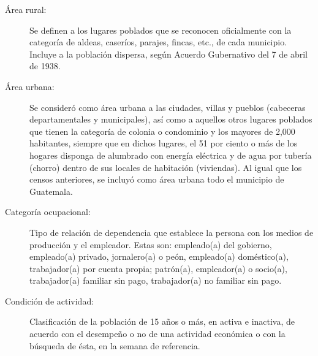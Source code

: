 \begin{description}
	\item[Área rural:] Se definen a los lugares poblados que se reconocen oficialmente con la categoría de aldeas, caseríos, parajes, fincas, etc., de cada municipio. Incluye a la población dispersa, según Acuerdo Gubernativo del 7 de abril de 1938.
	\item[Área urbana:] Se consideró como área urbana a las ciudades, villas y pueblos (cabeceras departamentales y municipales), así como a aquellos otros lugares poblados que tienen la categoría de colonia o condominio y los mayores de 2,000 habitantes, siempre que en dichos lugares, el 51 por ciento o más de los hogares disponga de alumbrado con energía eléctrica y de agua por tubería (chorro) dentro de sus locales de habitación (viviendas). Al igual que los censos anteriores, se incluyó como área urbana todo el municipio de Guatemala.
	\item[Categoría ocupacional:] Tipo de relación de dependencia que establece la persona con los medios de producción y el empleador. Estas son: empleado(a) del gobierno, empleado(a) privado, jornalero(a) o peón, empleado(a) doméstico(a), trabajador(a) por cuenta propia; patrón(a), empleador(a) o socio(a), trabajador(a) familiar sin pago, trabajador(a) no familiar sin pago.
	
	\item[Condición de actividad:] Clasificación de la población de 15 años o más, en activa e inactiva, de acuerdo con el desempeño o no de una actividad económica o con la búsqueda de ésta, en la semana de referencia.
	

\end{description}
